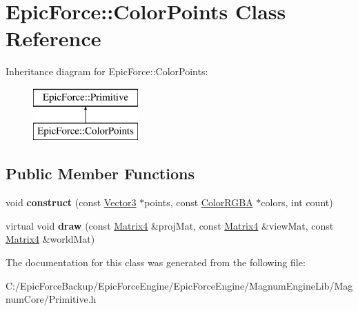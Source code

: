 \hypertarget{class_epic_force_1_1_color_points}{}\section{Epic\+Force\+:\+:Color\+Points Class Reference}
\label{class_epic_force_1_1_color_points}
Inheritance diagram for Epic\+Force\+:\+:Color\+Points\+:\begin{figure}[H]
\begin{center}
\leavevmode
\includegraphics[height=2.000000cm]{class_epic_force_1_1_color_points}
\end{center}
\end{figure}
\subsection*{Public Member Functions}
\begin{DoxyCompactItemize}
\item 
void {\bfseries construct} (const \hyperlink{class_magnum_1_1_vector3}{Vector3} $\ast$points, const \hyperlink{class_magnum_1_1_color_r_g_b_a}{Color\+R\+G\+BA} $\ast$colors, int count)\hypertarget{class_epic_force_1_1_color_points_aad44ecebe46aed6f22fdc606f6f1dc2b}{}\label{class_epic_force_1_1_color_points_aad44ecebe46aed6f22fdc606f6f1dc2b}

\item 
virtual void {\bfseries draw} (const \hyperlink{class_magnum_1_1_matrix4}{Matrix4} \&proj\+Mat, const \hyperlink{class_magnum_1_1_matrix4}{Matrix4} \&view\+Mat, const \hyperlink{class_magnum_1_1_matrix4}{Matrix4} \&world\+Mat)\hypertarget{class_epic_force_1_1_color_points_ac23bcfdae1075a44318b7805dc5ed28e}{}\label{class_epic_force_1_1_color_points_ac23bcfdae1075a44318b7805dc5ed28e}

\end{DoxyCompactItemize}


The documentation for this class was generated from the following file\+:\begin{DoxyCompactItemize}
\item 
C\+:/\+Epic\+Force\+Backup/\+Epic\+Force\+Engine/\+Epic\+Force\+Engine/\+Magnum\+Engine\+Lib/\+Magnum\+Core/Primitive.\+h\end{DoxyCompactItemize}
